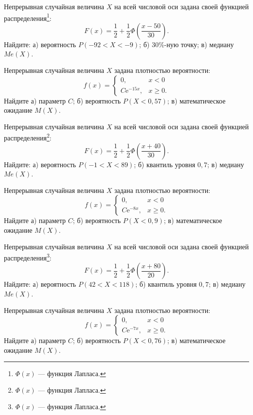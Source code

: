 

\z Непрерывная случайная величина $X$ на всей числовой оси задана своей функцией распределения\footnote{$\Phi(x)$ --- функция Лапласа.}: $$ F(x) = \frac{1}{2} + \frac{1}{2}\Phi\left( \frac{x - 50}{30} \right). $$ Найдите: а) вероятность $P(-92 < X < -9)$; б) $30\%$-ную точку; в) медиану $Me(X)$.


\vfill

\z Непрерывная случайная величина $X$ задана плотностью вероятности: $$ f(x) = \begin{cases}0, & x < 0 \\ C\mathrm{e}^{-15x}, & x \geqslant 0.\end{cases} $$ Найдите а) параметр $C$; б) вероятность $P(X < 0{,}57)$; в) математическое ожидание $M(X)$.
 

\vfill

\newpage\setcounter{zad}{0}

\z Непрерывная случайная величина $X$ на всей числовой оси задана своей функцией распределения\footnote{$\Phi(x)$ --- функция Лапласа.}: $$ F(x) = \frac{1}{2} + \frac{1}{2}\Phi\left( \frac{x + 40}{30} \right). $$ Найдите: а) вероятность $P(-1 < X < 89)$; б) квантиль уровня $0{,}7$; в) медиану $Me(X)$.


\vfill

\z Непрерывная случайная величина $X$ задана плотностью вероятности: $$ f(x) = \begin{cases}0, & x < 0 \\ C\mathrm{e}^{-8x}, & x \geqslant 0.\end{cases} $$ Найдите а) параметр $C$; б) вероятность $P(X < 0{,}9)$; в) математическое ожидание $M(X)$.
 

\vfill

\newpage\setcounter{zad}{0}

\z Непрерывная случайная величина $X$ на всей числовой оси задана своей функцией распределения\footnote{$\Phi(x)$ --- функция Лапласа.}: $$ F(x) = \frac{1}{2} + \frac{1}{2}\Phi\left( \frac{x + 80}{20} \right). $$ Найдите: а) вероятность $P(42 < X < 118)$; б) квантиль уровня $0{,}7$; в) медиану $Me(X)$.


\vfill

\z Непрерывная случайная величина $X$ задана плотностью вероятности: $$ f(x) = \begin{cases}0, & x < 0 \\ C\mathrm{e}^{-7x}, & x \geqslant 0.\end{cases} $$ Найдите а) параметр $C$; б) вероятность $P(X < 0{,}76)$; в) математическое ожидание $M(X)$.
 

